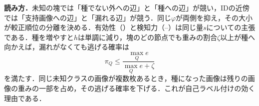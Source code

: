 \appblock
\textbf{読み方．}未知の塊では「種でない外への辺」と「種への辺」が競い，IDの近傍では「支持画像への辺」と「漏れる辺」が競う．同じ$\varphi$が両側を抑え，その大小が較正順位の分離を決める．有効性（\TValid）と検知力（\TEscape{}--\CSep）は同じ量$s$についての主張である．種を増やすと$h$は単調に減り，塊のどの節点でも重みの割合$\zeta$以上が種へ向かえば，漏れがなくても逃げる確率は
\begin{equation*}
\pi_Q\le\frac{\max_Qe}{\max_Qe+\zeta}
\end{equation*}
を満たす．同じ未知クラスの画像が複数枚あるとき，種になった画像は残りの画像の重みの一部を占め，その逃げる確率を下げる．これが自己ラベル付けの効く理由である．
